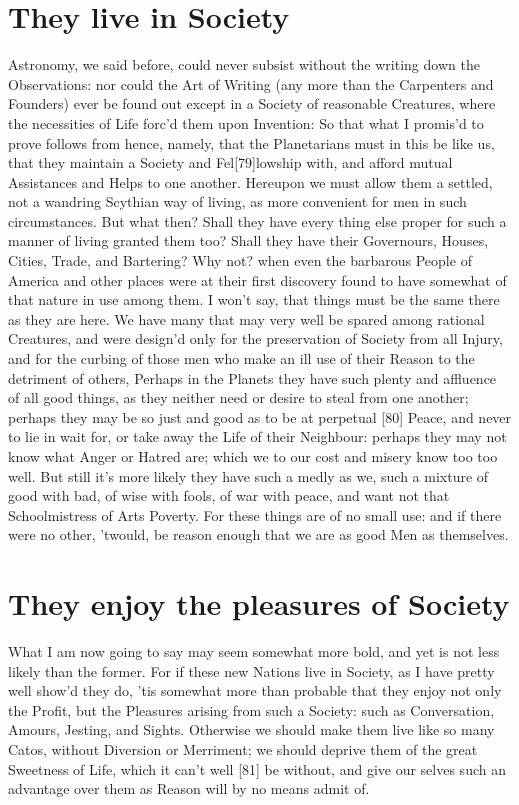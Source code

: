 \documentclass[letterpaper]{book}
\begin{document}
\section{They live in Society}

Astronomy, we said before, could never subsist without the writing down the
Observations: nor could the Art of Writing (any more than the Carpenters and
Founders) ever be found out except in a Society of reasonable Creatures,
where the necessities of Life forc'd them upon Invention: So that what I
promis'd to prove follows from hence, namely, that the Planetarians must in
this be like us, that they maintain a Society and Fel[79]lowship with, and
afford mutual Assistances and Helps to one another. Hereupon we must allow
them a settled, not a wandring Scythian way of living, as more convenient
for men in such circumstances. But what then? Shall they have every thing
else proper for such a manner of living granted them too? Shall they have
their Governours, Houses, Cities, Trade, and Bartering? Why not? when even
the barbarous People of America and other places were at their first
discovery found to have somewhat of that nature in use among them. I won't
say, that things must be the same there as they are here.  We have many that
may very well be spared among rational Creatures, and were design'd only for
the preservation of Society from all Injury, and for the curbing of those
men who make an ill use of their Reason to the detriment of others, Perhaps
in the Planets they have such plenty and affluence of all good things, as
they neither need or desire to steal from one another; perhaps they may be
so just and good as to be at perpetual [80] Peace, and never to lie in wait
for, or take away the Life of their Neighbour: perhaps they may not know
what Anger or Hatred are; which we to our cost and misery know too too well.
But still it's more likely they have such a medly as we, such a mixture of
good with bad, of wise with fools, of war with peace, and want not that
Schoolmistress of Arts Poverty. For these things are of no small use: and if
there were no other, 'twould, be reason enough that we are as good Men as
themselves.



\section{They enjoy the pleasures of Society}

What I am now going to say may seem somewhat more bold, and yet is
not less likely than the former. For if these new Nations live in Society,
as I have pretty well show'd they do, 'tis somewhat more than probable
that they enjoy not only the Profit, but the Pleasures arising from such a
Society: such as Conversation, Amours, Jesting, and Sights. Otherwise we
should make them live like so many Catos, without Diversion or Merriment;
we should deprive them of the great Sweetness of Life, which it can't well
[81] be without, and give our selves such an advantage over them as Reason
will by no means admit of.
\end{document}
